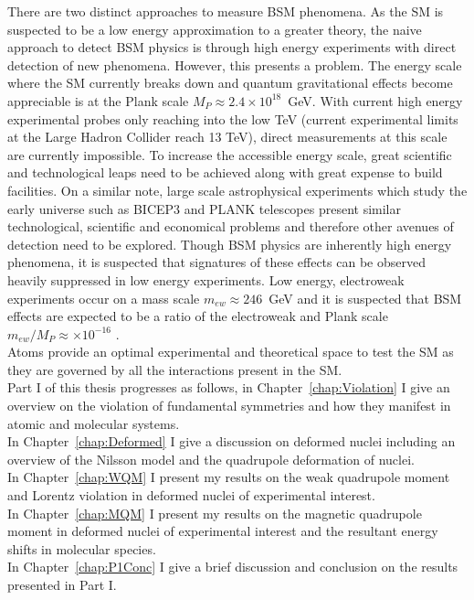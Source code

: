\documentclass[10pt,a4paper, twoside, openright]{report}
\begin{document}
There are two distinct approaches to measure BSM phenomena. As the SM is suspected to be a low energy approximation to a greater theory, the naive approach to detect BSM physics is through high energy experiments with direct detection of new phenomena. However, this presents a problem. The energy scale where the SM currently breaks down and quantum gravitational effects become appreciable is at the Plank scale $M_P \approx 2.4 \times 10^{18}$~GeV. With current high energy experimental probes only reaching into the low TeV (current experimental limits at the Large Hadron Collider reach 13 TeV), direct measurements at this scale are currently impossible. To increase the accessible energy scale, great scientific and technological leaps need to be achieved along with great expense to build facilities. On a similar note, large scale astrophysical experiments which study the early universe such as BICEP3\cite{BICEP3} and PLANK\cite{PLANK2016} telescopes present similar technological, scientific and economical problems and therefore other avenues of detection need to be explored. Though BSM physics are inherently high energy phenomena, it is suspected that signatures of these effects can be observed heavily suppressed in low energy experiments. Low energy,  electroweak experiments occur on a mass scale $m_{ew} \approx 246$~GeV and it is suspected that BSM effects are expected to be a ratio of the electroweak and Plank scale $m_{ew}/M_P \approx \times 10^{-16}$  \cite{Kostelecky1995}. \\
\linebreak
Atoms provide an optimal experimental and theoretical space to test the SM as they are governed by all the interactions present in the SM. \\
\linebreak
Part I of this thesis progresses as follows, in Chapter~\ref{chap:Violation} I give an overview on the violation of fundamental symmetries and how  they manifest in atomic and molecular systems. \\
\linebreak
In Chapter~\ref{chap:Deformed} I give a discussion on deformed nuclei including an overview of the Nilsson model and the quadrupole deformation of nuclei. \\
\linebreak
In Chapter~\ref{chap:WQM} I present my results on the weak quadrupole moment and Lorentz violation in deformed nuclei of experimental interest. \\
\linebreak
In Chapter~\ref{chap:MQM} I present my results on the magnetic quadrupole moment in deformed nuclei of experimental interest and the resultant energy shifts in molecular species. \\
\linebreak
In Chapter~\ref{chap:P1Conc} I give a brief discussion and conclusion on the results presented in Part I. \\
\linebreak
\end{document}
